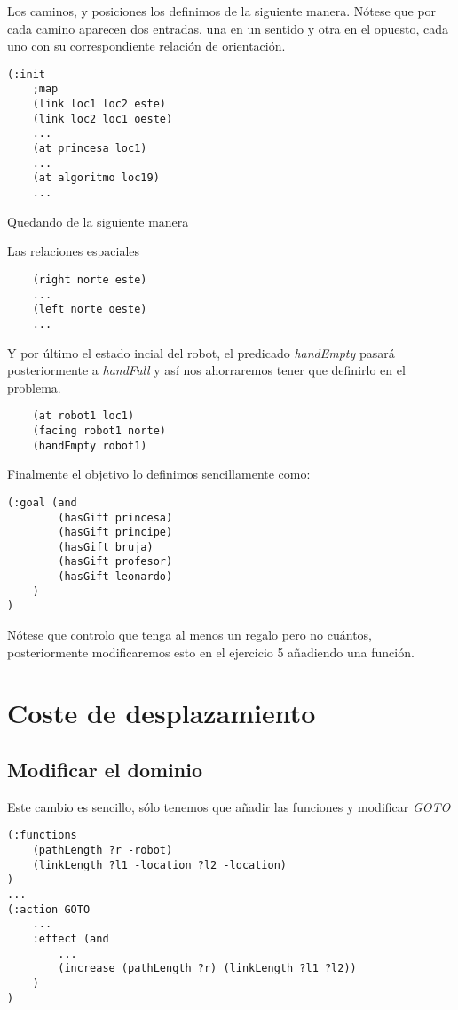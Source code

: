 \documentclass{article}
\newcommand{\img}[1]{
\noindent\makebox[0.9\textwidth][c]{\texttt{[image: \#1]}}%
}
\begin{document}
Los caminos, y posiciones los definimos de la siguiente manera. Nótese que por cada camino aparecen dos entradas, una en un sentido y otra en el opuesto, cada uno con su correspondiente relación de orientación.
\begin{lstlisting}
(:init
    ;map
    (link loc1 loc2 este)
    (link loc2 loc1 oeste)
    ...
    (at princesa loc1)
    ...
    (at algoritmo loc19)
    ...    
\end{lstlisting}

Quedando de la siguiente manera

\img{img/map1}

Las relaciones espaciales 
\begin{lstlisting}
	(right norte este)
    ...
    (left norte oeste)
    ...
\end{lstlisting}

Y por último el estado incial del robot, el predicado \emph{handEmpty} pasará posteriormente a \emph{handFull} y así nos ahorraremos tener que definirlo en el problema.

\begin{lstlisting}
	(at robot1 loc1)
    (facing robot1 norte)
    (handEmpty robot1)
\end{lstlisting}

Finalmente el objetivo lo definimos sencillamente como:

\begin{lstlisting}
(:goal (and
        (hasGift princesa)
        (hasGift principe)
        (hasGift bruja)
        (hasGift profesor)
        (hasGift leonardo)
    )
)
\end{lstlisting}

Nótese que controlo que tenga al menos un regalo pero no cuántos, posteriormente modificaremos esto en el ejercicio 5 añadiendo una función.

\section{Coste de desplazamiento}

\subsection{Modificar el dominio}

	Este cambio es sencillo, sólo tenemos que añadir las funciones y modificar \emph{GOTO}
\begin{lstlisting}
(:functions 
    (pathLength ?r -robot)
    (linkLength ?l1 -location ?l2 -location)
)
...
(:action GOTO
    ...
    :effect (and 
        ...
        (increase (pathLength ?r) (linkLength ?l1 ?l2))
    )
)
\end{lstlisting}
\end{document}

